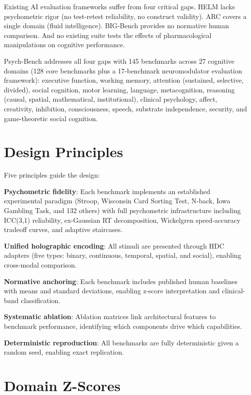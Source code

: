 \documentclass[12pt]{book}
\begin{document}
Existing AI evaluation frameworks suffer from four critical gaps. HELM lacks psychometric rigor (no test-retest reliability, no construct validity). ARC covers a single domain (fluid intelligence). BIG-Bench provides no normative human comparison. And no existing suite tests the effects of pharmacological manipulations on cognitive performance.

Psych-Bench addresses all four gaps with 145 benchmarks across 27 cognitive domains (128 core benchmarks plus a 17-benchmark neuromodulator evaluation framework): executive function, working memory, attention (sustained, selective, divided), social cognition, motor learning, language, metacognition, reasoning (causal, spatial, mathematical, institutional), clinical psychology, affect, creativity, inhibition, consciousness, speech, substrate independence, security, and game-theoretic social cognition.

\section{Design Principles}

Five principles guide the design:

\textbf{Psychometric fidelity}: Each benchmark implements an established experimental paradigm (Stroop, Wisconsin Card Sorting Test, N-back, Iowa Gambling Task, and 132 others) with full psychometric infrastructure including ICC(3,1) reliability, ex-Gaussian RT decomposition, Wickelgren speed-accuracy tradeoff curves, and adaptive staircases.

\textbf{Unified holographic encoding}: All stimuli are presented through HDC adapters (five types: binary, continuous, temporal, spatial, and social), enabling cross-modal comparison.

\textbf{Normative anchoring}: Each benchmark includes published human baselines with means and standard deviations, enabling z-score interpretation and clinical-band classification.

\textbf{Systematic ablation}: Ablation matrices link architectural features to benchmark performance, identifying which components drive which capabilities.

\textbf{Deterministic reproduction}: All benchmarks are fully deterministic given a random seed, enabling exact replication.

\section{Domain Z-Scores}
\end{document}
